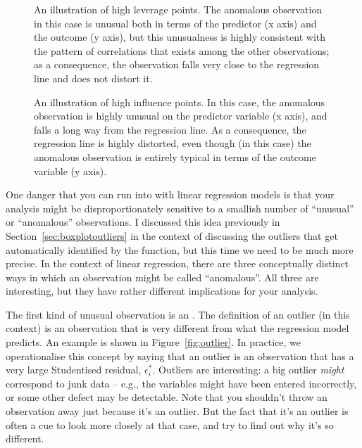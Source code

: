 \begin{figure}[t]
\begin{center}
\caption{An illustration of high leverage points. The anomalous observation in this case is unusual both in terms of the predictor (x axis) and the outcome (y axis), but this unusualness is highly consistent with the pattern of correlations that exists among the other observations; as a consequence, the observation falls very close to the regression line and does not distort it.}
\HR
\label{fig:leverage}
\end{center}
\end{figure}

\begin{figure}[t]
\begin{center}
\caption{An illustration of high influence points. In this case, the anomalous observation is highly unusual on the predictor variable (x axis), and falls a long way from the regression line. As a consequence, the regression line is highly distorted, even though (in this case) the anomalous observation is entirely typical in terms of the outcome variable (y axis).}
\HR
\label{fig:influence}
\end{center}
\end{figure}



One danger that you can run into with linear regression models is that your analysis might be disproportionately sensitive to a smallish number of ``unusual'' or ``anomalous'' observations. I discussed this idea previously in Section~\ref{sec:boxplotoutliers} in the context of discussing the outliers that get automatically identified by the  function, but this time we need to be much more precise. In the context of linear regression, there are three conceptually distinct ways in which an observation might be called ``anomalous''. All three are interesting, but they have rather different implications for your analysis.

The first kind of unusual observation is an . The definition of an outlier (in this context) is an observation that is very different from what the regression model predicts. An example is shown in Figure~\ref{fig:outlier}. In practice, we operationalise this concept by saying that an outlier is an observation that has a very large Studentised residual, $\epsilon_i^*$. Outliers are interesting: a big outlier {\it might} correspond to junk data -- e.g., the variables might have been entered incorrectly, or some other defect may be detectable. Note that you shouldn't throw an observation away just because it's an outlier. But the fact that it's an outlier is often a cue to look more closely at that case, and try to find out why it's so different.

